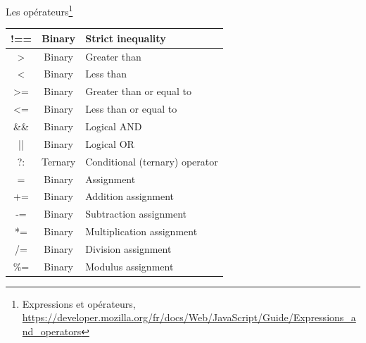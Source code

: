 \documentclass{beamer}
\begin{document}
\begin{frame}{Les opérateurs\footnote{\label{operators}Expressions et opérateurs, \url{https://developer.mozilla.org/fr/docs/Web/JavaScript/Guide/Expressions_and_operators}}}
\begin{tiny}
\begin{table}[h!]
\begin{tabular}{|c|c|p{8cm}|}
                    !==               & Binary        & Strict inequality                \\
                    \hline
                    >                 & Binary        & Greater than                     \\
                    \hline
                    <                 & Binary        & Less than                        \\
                    \hline
                    >=                & Binary        & Greater than or equal to         \\
                    \hline
                    <=                & Binary        & Less than or equal to            \\
                    \hline
                    \&\&              & Binary        & Logical AND                      \\
                    \hline
                    ||                & Binary        & Logical OR                       \\
                    \hline
                    ?:                & Ternary       & Conditional (ternary) operator   \\
                    \hline
                    =                 & Binary        & Assignment                       \\
                    \hline
                    +=                & Binary        & Addition assignment              \\
                    \hline
                    -=                & Binary        & Subtraction assignment           \\
                    \hline
                    *=                & Binary        & Multiplication assignment        \\
                    \hline
                    /=                & Binary        & Division assignment              \\
                    \hline
                    \%=               & Binary        & Modulus assignment               \\
                    \hline
                \end{tabular}
            \end{table}
        \end{tiny}
    \end{frame}
\end{document}
